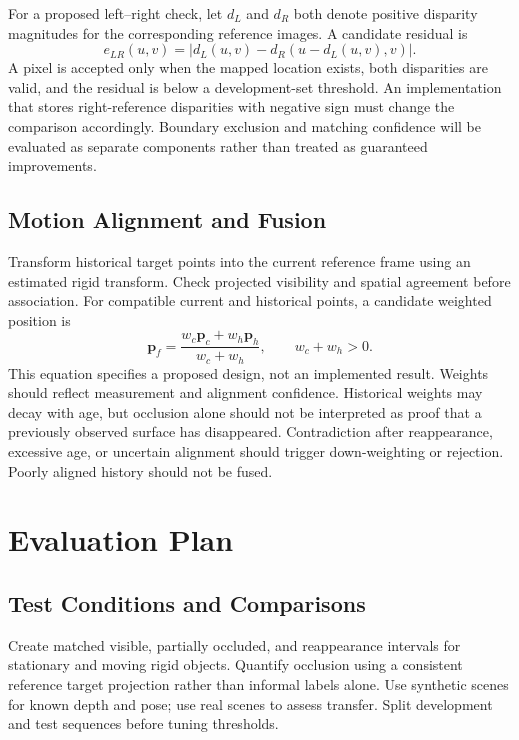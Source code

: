 For a proposed left--right check, let $d_L$ and $d_R$ both denote positive disparity magnitudes for the corresponding reference images. A candidate residual is
\begin{equation}
e_{LR}(u,v)=|d_L(u,v)-d_R(u-d_L(u,v),v)|.
\end{equation}
A pixel is accepted only when the mapped location exists, both disparities are valid, and the residual is below a development-set threshold. An implementation that stores right-reference disparities with negative sign must change the comparison accordingly. Boundary exclusion and matching confidence will be evaluated as separate components rather than treated as guaranteed improvements.

\subsection{Motion Alignment and Fusion}
Transform historical target points into the current reference frame using an estimated rigid transform. Check projected visibility and spatial agreement before association. For compatible current and historical points, a candidate weighted position is
\begin{equation}
\mathbf p_f=\frac{w_c\mathbf p_c+w_h\mathbf p_h}{w_c+w_h},\qquad w_c+w_h>0.
\end{equation}
This equation specifies a proposed design, not an implemented result. Weights should reflect measurement and alignment confidence. Historical weights may decay with age, but occlusion alone should not be interpreted as proof that a previously observed surface has disappeared. Contradiction after reappearance, excessive age, or uncertain alignment should trigger down-weighting or rejection. Poorly aligned history should not be fused.

\section{Evaluation Plan}
\subsection{Test Conditions and Comparisons}
Create matched visible, partially occluded, and reappearance intervals for stationary and moving rigid objects. Quantify occlusion using a consistent reference target projection rather than informal labels alone. Use synthetic scenes for known depth and pose; use real scenes to assess transfer. Split development and test sequences before tuning thresholds.


